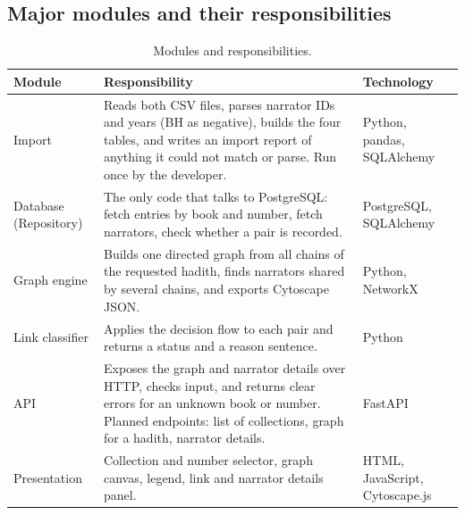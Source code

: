\documentclass[11pt,a4paper]{article}
\begin{document}
\subsection{Major modules and their responsibilities}
\begin{table}[H]
\centering
\small
\begin{tabularx}{\textwidth}{@{}p{2.9cm}Xp{3.0cm}@{}}
\toprule
\textbf{Module} & \textbf{Responsibility} & \textbf{Technology}\\
\midrule
Import & Reads both CSV files, parses narrator IDs and years (BH as negative), builds the four tables, and writes an import report of anything it could not match or parse. Run once by the developer. & Python, pandas, SQLAlchemy\\
Database (Repository) & The only code that talks to PostgreSQL: fetch entries by book and number, fetch narrators, check whether a pair is recorded. & PostgreSQL, SQLAlchemy\\
Graph engine & Builds one directed graph from all chains of the requested hadith, finds narrators shared by several chains, and exports Cytoscape JSON. & Python, NetworkX\\
Link classifier & Applies the decision flow to each pair and returns a status and a reason sentence. & Python\\
API & Exposes the graph and narrator details over HTTP, checks input, and returns clear errors for an unknown book or number. Planned endpoints: list of collections, graph for a hadith, narrator details. & FastAPI\\
Presentation & Collection and number selector, graph canvas, legend, link and narrator details panel. & HTML, JavaScript, Cytoscape.js\\
\bottomrule
\end{tabularx}
\caption{Modules and responsibilities.}
\end{table}

\end{document}
